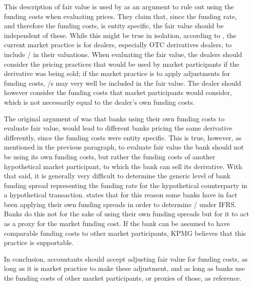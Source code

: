 \documentclass[main.tex]{subfiles}
\begin{document}
            This description of fair value is used by \textcite{HullWhiteFVA} as an argument to
            rule out using the funding costs when evaluating prices.
            They claim that, since the funding rate, and therefore the funding costs, is entity specific,
            the fair value should be independent of these.
            While this might be true in isolation, 
            according to \textcite{KPMGFVA}, the current market practice is for dealers, 
            especially OTC derivatives dealers, to include \FVA/ in their valuations.  
            When evaluating the fair value, the dealers should consider the pricing practices 
            that would be used by market participants if the derivative was being sold;
            if the market practice is to apply adjustments for funding costs,
            \FVA/s may very well be included in the fair value.
            The dealer should however consider the funding costs that market participants would consider,
            which is not necessarily equal to the dealer's own funding costs.

            The original argument of \textcite{HullWhiteFVA} was that banks using their own funding costs to evaluate fair value,
            would lead to different banks pricing the same derivative differently,
            since the funding costs were entity specific.
            This is true, however, as mentioned in the previous paragraph,
            to evaluate fair value the bank should not be using its own funding costs, 
            but rather the funding costs of another hypothetical market participant, 
            to which the bank can sell its derivative.
            With that said, it is generally very difficult to determine the generic level of bank funding spread
            representing the funding rate for the hypothetical counterparty in a hypothetical transaction.
            \textcite[Proposition 4]{KPMGFVA} states that for this reason 
            some banks have in fact been applying their own funding spreads in order to determine \FVA/ under IFRS. 
            Banks do this not for the sake of using their own funding spreads
            but for it to act as a proxy for the market funding cost.
            If the bank can be assumed to have comparable funding costs to other market participants,
            KPMG believes that this practice is supportable.

            In conclusion, accountants should accept adjusting fair value for funding costs,
            as long as it is market practice to make these adjustment,
            and as long as banks use the funding costs of other market participants, 
            or proxies of those, as reference.
\end{document}
